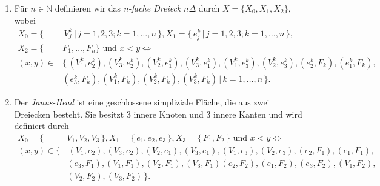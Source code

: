 \documentclass[12pt,titlepage]{article}
\begin{document}
\begin{enumerate}
 \item
 Für $n \in \mathbb{N}$ definieren wir das \emph{n-fache Dreieck} $n \Delta$ durch $X=\{X_{0},X_{1},X_{2}\}$, wobei
 \begin{align*}
  X_{0}=\{& \,V_{j}^{k}\,\vert\, j=1,2,3 ;k=1,\ldots,n\,\}, X_{1}=\{\,e_{j}^{k}\,\vert\, j=1,2,3 ;k=1,\ldots,n\,\},\\
   X_{2}=\{&F_{1},\ldots,F_{n}\} \text{ und } x<y \Leftrightarrow \\
 (x,y)\in &\{\,(V_{1}^{k},e_{2}^{k}),(V_{3}^{k},e_{2}^{k}),(V_{2}^{k},e_{1}^{k}),(V_{3}^{k},e_{1}^{k}),(V_{1}^{k},e_{3}^{k}),(V_{2}^{k},e_{3}^{k}),(e_{2}^{k},F_{k}), (e_{1}^{k},F_{k}),\\
 &(e_{3}^{k},F_{k}),(V_{1}^{k},F_{k}),(V_{2}^{k},F_{k}),(V_{3}^{k},F_{k})\,\vert \, k=1,\ldots,n \,\}.
 \end{align*}
 
 \item 
 Der \emph{Janus-Head} ist eine geschlossene simpliziale Fläche, die aus zwei Dreiecken besteht.	Sie besitzt 3 innere Knoten und  3 innere Kanten und wird definiert durch
 \begin{align*}
 X_{0}=\{\,&V_{1},V_{2},V_{3}\,\} ,X_{1}=\{\,e_{1},e_{2},e_{3}\,\},X_{3}=\{\, F_{1},F_{2}\,\}  \text{ und } x<y \Leftrightarrow \\
 (x,y)\in\{&\,(V_{1},e_{2}),(V_{3},e_{2}),(V_{2},e_{1}),(V_{3},e_{1}),(V_{1},e_{3}),(V_{2},e_{3}),(e_{2},F_{1}), (e_{1},F_{1}),\\
 & (e_{3},F_{1}),(V_{1},F_{1}),(V_{2},F_{1}),(V_{3},F_{1})
 (e_{2},F_{2}), (e_{1},F_{2}), (e_{3},F_{2}),(V_{1},F_{2}),\\&(V_{2},F_{2}),(V_{3},F_{2})\,\}.
 \end{align*}
\begin{tikzpicture}[line cap=round,line join=round,>=triangle 45,x=1.0cm,y=1.0cm]


\end{tikzpicture}
\end{enumerate}
\end{document}
